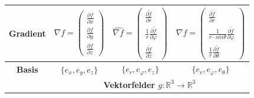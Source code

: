 \documentclass[6pt,a4paper]{scrartcl}
\begin{document}
\begin{center}
\begin{tabular}{|c|c|c|c|}
        \hline
        \textbf{Gradient}         & $\nabla f=\begin{pmatrix} \frac{\partial f}{\partial x} \\ \frac{\partial f}{\partial y} \\ \frac{\partial f}{\partial z} \end{pmatrix}$                                                                         & $\widehat{\nabla f}=\begin{pmatrix} \frac{\partial\tilde{f}}{\partial r} \\ \frac{1}{r}\frac{\partial\tilde{f}}{\partial\varphi} \\ \frac{\partial\tilde{f}}{\partial z} \end{pmatrix}$                                                                                                                                                                     & $\widehat{\nabla f}=\begin{pmatrix} \frac{\partial\tilde{f}}{\partial r} \\ \frac{1}{r\cdot sin\theta}\frac{\partial\tilde{f}}{\partial\varphi} \\ \frac{1}{r}\frac{\partial\tilde{f}}{\partial\theta} \end{pmatrix}$                                                                                                                                                                                                                                                                        \\
        \hline
        \textbf{Basis}            & $\{e_x,e_y,e_z\}$                                                                                             & $\{e_r,e_\varphi,e_z\}$                                                                                                                                                                                             & $\{e_r,e_\varphi,e_\theta\}$                                                                                                                                                                                                                                                                                           \\
        \hline
                                  & \multicolumn{3}{c|}{\textbf{Vektorfelder $g:\mathbb{R}^3\rightarrow\mathbb{R}^3$}}                                                                                                                                                                                                                                                                                                                                                                                                                                                                                                                                                                           \\

\end{tabular}
\end{center}
\end{document}
